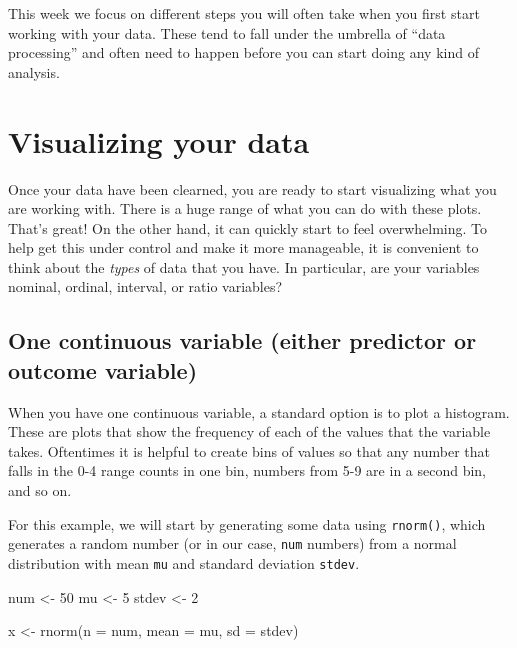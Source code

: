 \documentclass[
]{book}
\newenvironment{Shaded}{\begin{snugshade}}{\end{snugshade}}
\newcommand{\AttributeTok}[1]{\textcolor[rgb]{0.77,0.63,0.00}{#1}}
\newcommand{\DecValTok}[1]{\textcolor[rgb]{0.00,0.00,0.81}{#1}}
\newcommand{\FunctionTok}[1]{\textcolor[rgb]{0.00,0.00,0.00}{#1}}
\newcommand{\NormalTok}[1]{#1}
\newcommand{\OtherTok}[1]{\textcolor[rgb]{0.56,0.35,0.01}{#1}}
\begin{document}
This week we focus on different steps you will often take when you first start working with your data. These tend to fall under the umbrella of ``data processing'' and often need to happen before you can start doing any kind of analysis.

\hypertarget{visualizing-your-data}{%
\section{Visualizing your data}\label{visualizing-your-data}}

Once your data have been clearned, you are ready to start visualizing what you are working with. There is a huge range of what you can do with these plots. That's great! On the other hand, it can quickly start to feel overwhelming. To help get this under control and make it more manageable, it is convenient to think about the \emph{types} of data that you have. In particular, are your variables nominal, ordinal, interval, or ratio variables?

\hypertarget{one-continuous-variable-either-predictor-or-outcome-variable}{%
\subsection{One continuous variable (either predictor or outcome variable)}\label{one-continuous-variable-either-predictor-or-outcome-variable}}

When you have one continuous variable, a standard option is to plot a histogram. These are plots that show the frequency of each of the values that the variable takes. Oftentimes it is helpful to create bins of values so that any number that falls in the 0-4 range counts in one bin, numbers from 5-9 are in a second bin, and so on.

For this example, we will start by generating some data using \texttt{rnorm()}, which generates a random number (or in our case, \texttt{num} numbers) from a normal distribution with mean \texttt{mu} and standard deviation \texttt{stdev}.

\begin{Shaded}
\begin{Highlighting}[]
\NormalTok{num }\OtherTok{\textless{}{-}} \DecValTok{50}
\NormalTok{mu }\OtherTok{\textless{}{-}} \DecValTok{5}
\NormalTok{stdev }\OtherTok{\textless{}{-}} \DecValTok{2}

\NormalTok{x }\OtherTok{\textless{}{-}} \FunctionTok{rnorm}\NormalTok{(}\AttributeTok{n =}\NormalTok{ num, }\AttributeTok{mean =}\NormalTok{ mu, }\AttributeTok{sd =}\NormalTok{ stdev)}
\end{Highlighting}
\end{Shaded}
\end{document}
